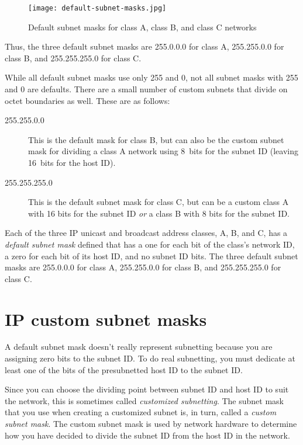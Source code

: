 \begin{figure}
   \centering
   \texttt{[image: default-subnet-masks.jpg]}
   \caption{Default subnet masks for class A, class B, and class C networks}
   \label{fig:default-subnet-masks}
\end{figure}

Thus, the three default subnet masks are 255.0.0.0 for class A, 255.255.0.0 for class B, and 255.255.255.0 for class C.

While all default subnet masks use only 255 and 0, not all subnet masks with 255 and 0 are defaults.
There are a small number of custom subnets that divide on octet boundaries as well. These are as follows:

\begin{description}
   \item[255.255.0.0]
      This is the default mask for class B, but can also be the custom subnet mask for dividing a class A network using 8~bits for the subnet ID
      (leaving 16~bits for the host ID).

   \item[255.255.255.0]
      This is the default subnet mask for class C, but can be a custom class A with 16 bits for the subnet ID \emph{or} a class B with 8 bits for the subnet ID.
\end{description}


\begin{keyconcept}
Each of the three IP unicast and broadcast address classes, A, B, and C, has a \emph{default subnet mask} defined
that has a one for each bit of the class's network ID, a zero for each bit of its host ID, and no subnet ID bits.
The three default subnet masks are 255.0.0.0 for class A, 255.255.0.0 for class B, and 255.255.255.0 for class C.
\end{keyconcept}




\section{IP custom subnet masks}
\label{sec:ip-custom-subnet-masks}

A default subnet mask doesn't really represent subnetting because you
are assigning zero bits to the subnet ID. To do real subnetting, you
must dedicate at least one of the bits of the presubnetted host ID to
the subnet ID.

Since you can choose the dividing point between subnet ID and host ID to suit the network, this is sometimes called \emph{customized subnetting}.
The subnet mask that you use when creating a customized subnet is, in turn, called a \emph{custom subnet mask}.
The custom subnet mask is used by network hardware to determine how you have decided to divide the subnet ID from the host ID in the network.



